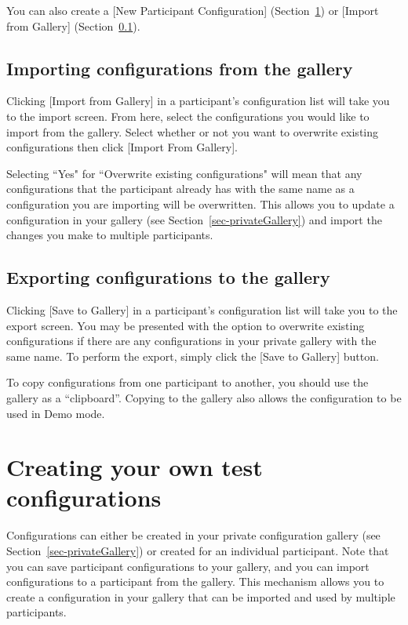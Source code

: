 \documentclass{article}
\begin{document}
You can also create a [New Participant Configuration]
(Section~\ref{sec-creatingConfigurations}) or [Import from Gallery]
(Section~\ref{sec-importingFromGallery}).

\subsection{Importing configurations from the gallery}
\label{sec-importingFromGallery}

Clicking [Import from Gallery] in a participant's configuration list will take you to the import screen. From here, select the configurations you would like to import from the gallery. Select whether or not you want to overwrite existing configurations then click [Import From Gallery].

Selecting ``Yes" for ``Overwrite existing configurations" will mean that any configurations that the participant already has with the same name as a configuration you are importing will be overwritten. This allows you to update a configuration in your gallery (see Section~\ref{sec-privateGallery}) and import the changes you make to multiple participants.

\subsection{Exporting configurations to the gallery}

Clicking [Save to Gallery] in a participant's configuration list will
take you to the export screen.
You may be presented with the option to overwrite existing
configurations if there are any configurations in your private gallery
with the same name.
To perform the export, simply click the [Save to Gallery] button.

To copy configurations from one participant to another, you should use the gallery as a ``clipboard''. Copying to the
gallery also allows the configuration to be used in Demo mode.


\section{Creating your own test configurations}
\label{sec-creatingConfigurations}

Configurations can either be created in your private configuration gallery (see Section~\ref{sec-privateGallery}) or created for an individual participant. Note that you can save participant configurations to your gallery, and you can import configurations to a participant from the gallery. This mechanism allows you to create a configuration in your gallery that can be imported and used by multiple participants.
\end{document}
